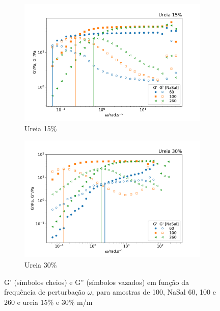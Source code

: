 	\begin{figure}[h]
	\begin{subfigure}[t]{0.5\textwidth}
		\centering
		\includegraphics[width=\textwidth]{imagens/reologia/oscilatorio_ur15p}
		\caption{Ureia 15\%}
		\label{fig:oscilatorio_ur_15p}
	\end{subfigure} %
	\begin{subfigure}[t]{0.5\textwidth}
		\centering
		\includegraphics[width=\textwidth]{imagens/reologia/oscilatorio_ur30p}
		\caption{Ureia 30\%}
		\label{fig:oscilatorio_ur_30p}
	\end{subfigure} %
	\caption{G' (símbolos cheios) e G'' (símbolos vazados) em função da frequência de perturbação \(\omega\), para amostras de \CTAB{} 100\mM{}, NaSal 60, 100 e 260\mM{} e ureia 15\% e 30\% m/m}
	\label{fig:oscilatorio_ur}
	\end{figure}

